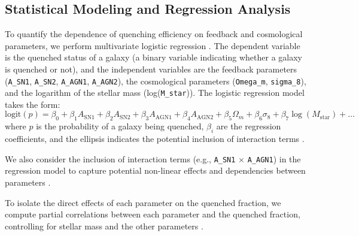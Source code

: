 \documentclass[twocolumn]{aastex631}
\begin{document}
\subsection{Statistical Modeling and Regression Analysis}
To quantify the dependence of quenching efficiency on feedback and cosmological parameters, we perform multivariate logistic regression \citep{kuschel2023investigatingdominantenvironmentalquenching,xie2024quenchedgalaxieshow,rutkowski2025recentstarformation05z15}. The dependent variable is the quenched status of a galaxy (a binary variable indicating whether a galaxy is quenched or not), and the independent variables are the feedback parameters (\texttt{A\_SN1}, \texttt{A\_SN2}, \texttt{A\_AGN1}, \texttt{A\_AGN2}), the cosmological parameters (\texttt{Omega\_m}, \texttt{sigma\_8}), and the logarithm of the stellar mass (log(\texttt{M\_star})). The logistic regression model takes the form:
\begin{equation}
\text{logit}(p) = \beta_0 + \beta_1 A_{\text{SN1}} + \beta_2 A_{\text{SN2}} + \beta_3 A_{\text{AGN1}} + \beta_4 A_{\text{AGN2}} + \beta_5 \Omega_m + \beta_6 \sigma_8 + \beta_7 \log(M_{\text{star}}) + \dots
\end{equation}
where \( p \) is the probability of a galaxy being quenched, \( \beta_i \) are the regression coefficients, and the ellipsis indicates the potential inclusion of interaction terms \citep{romerogómez2024earlytypegalaxiesquenchedpresentday,zheng2025photometricobjectscosmicwebs}.

We also consider the inclusion of interaction terms (e.g., \texttt{A\_SN1} $\times$ \texttt{A\_AGN1}) in the regression model to capture potential non-linear effects and dependencies between parameters \citep{llorella2025exploringsymbolicregressiongenetic,tian2025interactivesymbolicregressionoffline}.

To isolate the direct effects of each parameter on the quenched fraction, we compute partial correlations between each parameter and the quenched fraction, controlling for stellar mass and the other parameters \citep{porrasvalverde2024signatureblackholesquenched}.
\end{document}
